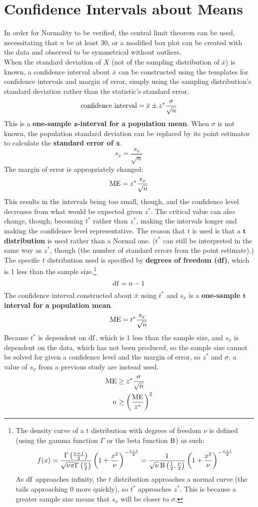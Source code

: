\documentclass[../AP_Statistics.tex]{subfiles}
\begin{document}
		\section{Confidence Intervals about Means}
			In order for Normality to be verified, the central limit theorem can be used, necessitating that $n$ be at least 30, or a modified box plot can be created with the data and observed to be symmetrical without outliers. \\
			When the standard deviation of $X$ (not of the sampling distribution of $\bar{x}$) is known, a confidence interval about $\bar{x}$ can be constructed using the templates for confidence intervals and margin of error, simply using the sampling distribution's standard deviation rather than the statistic's standard error.
			\[\text{confidence interval} = \bar{x} \pm z^*\frac{\sigma}{\sqrt{n}}\]
			This is a \textbf{one-sample $\bm{z}$-interval for a population mean}.
			When $\sigma$ is not known, the population standard deviation can be replaced by its point estimator to calculate the \textbf{standard error of $\bm{\bar{x}}$}.
			\[s_{\bar{x}} = \frac{s_x}{\sqrt{n}}\]
			The margin of error is appropriately changed:
			\[\operatorname{ME} = z^*\frac{s_x}{\sqrt{n}}\]
			This results in the intervals being too small, though, and the confidence level decreases from what would be expected given $z^*$. The critical value can also change, though, becoming $t^*$ rather than $z^*$, making the intervals longer and making the confidence level representative. The reason that $t$ is used is that a $\bm{t}$\textbf{ distribution} is used rather than a Normal one. ($t^*$ can still be interpreted in the same way as $z^*$, though (the number of standard errors from the point estimate).) \\
			The specific $t$ distribution used is specified by \textbf{degrees of freedom (df)}, which  is 1 less than the sample size.\footnote{The density curve of a $t$ distribution with degrees of freedom $\nu$ is defined (using the gamma function $\Gamma$ or the beta function $\operatorname{\mathrm{B}}$) as such:\[f(x) = \frac{\Gamma\left(\frac{\nu + 1}{2}\right)}{\sqrt{\nu\pi}\Gamma\left(\frac{\nu}{2}\right)}\left(1 + \frac{x^2}{\nu}\right)^{-\frac{\nu + 1}{2}} = \frac{1}{\sqrt{\nu}\operatorname{\mathrm{B}}\left(\frac{1}{2},\frac{\nu}{2}\right)}\left(1 + \frac{x^2}{\nu}\right)^{-\frac{\nu + 1}{2}}\]As $\operatorname{\mathrm{df}}$ approaches infinity, the $t$ distribution approaches a normal curve (the tails approaching 0 more quickly), so $t^*$ approaches $z^*$. This is because a greater sample size means that $s_x$ will be closer to $\sigma$.} \\
			\[\operatorname{\mathrm{df}} = n - 1\]
			The confidence interval constructed about $\bar{x}$ using $t^*$ and $s_x$ is a \textbf{one-sample $\bm{t}$ interval for a population mean}.
			\[\operatorname{ME} = t^*\frac{s_x}{\sqrt{n}}\]
			Because $t^*$ is dependent on $\operatorname{\mathrm{df}}$, which is 1 less than the sample size, and $s_x$ is dependent on the data, which has not been produced, so the sample size cannot be solved for given a confidence level and the margin of error, so $z^*$ and $\sigma$, a value of $s_x$ from a previous study are instead used.
			\begin{align*}
				\operatorname{ME} &\ge z^*\frac{\sigma}{\sqrt{n}} \\
				n &\ge \left(\frac{\operatorname{ME}}{z^*}\right)^2
			\end{align*}
\end{document}
